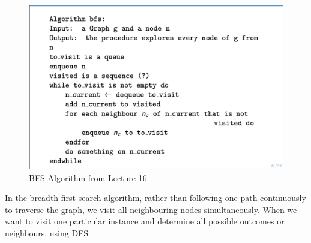 \documentclass[11pt,reqno]{amsart}
\theoremstyle{definition}
\numberwithin{equation}{section}
\begin{document}
\begin{figure}[h!]
	\centering
	\includegraphics[width=1\linewidth]{bfs}
	\caption{BFS Algorithm from Lecture 16}
	\label{fig:BFS}
\end{figure}
In the breadth first search algorithm, rather than following one path continuously to traverse the graph, we visit all neighbouring nodes simultaneously. When we want to visit one particular instance and determine all possible outcomes or neighbours, using DFS 
\end{document}
